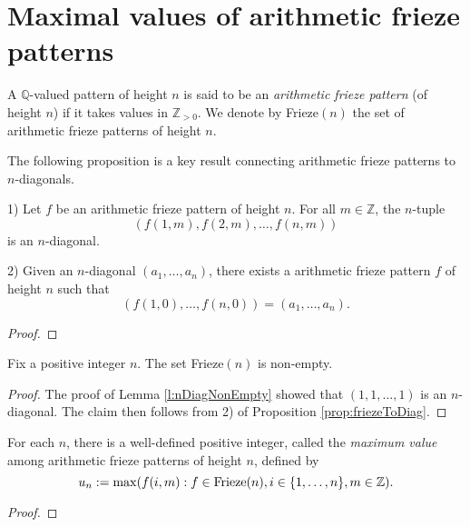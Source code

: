 \chapter{Maximal values of arithmetic frieze patterns}\label{s:arith_fp}
\begin{definition}
    \label{def:arith_fp}
        A $\mathbb{Q}$-valued pattern of height $n$ is said to be an \textit{arithmetic frieze pattern} (of height $n$) if it takes values in $\mathbb{Z}_{>0}$. 
        We denote by Frieze$(n)$ the set of arithmetic frieze patterns of height $n$. 
\end{definition}

The following proposition is a key result connecting arithmetic frieze patterns to $n$-diagonals.
\begin{proposition}
    \label{prop:friezeToDiag}
1) Let $f$ be an arithmetic frieze pattern of height $n$. For all $m \in \mathbb{Z}$, the $n$-tuple
\[
    (f (1,m), f (2,m), \ldots, f (n,m))
\]
is an $n$-diagonal.

2) Given an $n$-diagonal $(a_1, \ldots, a_n)$, there exists a arithmetic frieze pattern $f$ of height $n$ such that
\[
    (f (1,0), \ldots, f (n,0)) = (a_1, \ldots, a_n).
\]
\end{proposition}
\begin{proof}

\end{proof}

\begin{corollary}
    \label{c:friezeNonEmpty}
    Fix a positive integer $n$. The set Frieze$(n)$ is non-empty.
\end{corollary}
\begin{proof}
    The proof of Lemma \ref{l:nDiagNonEmpty} showed that $(1,1,\ldots, 1)$ is an $n$-diagonal. 
    The claim then follows from 2) of Proposition \ref{prop:friezeToDiag}.
\end{proof}

\begin{corollary}
    \label{l:maxDefined}
    For each $n$, there is a well-defined
    positive integer, called the {\it maximum value} among arithmetic frieze patterns of height $n$, defined by
    \[
        u_n := \max ( f (i,m) : f \in  {\rm Frieze}(n), i \in \{1,\ldots, n\}, m \in \mathbb{Z}).
    \]
\end{corollary}
\begin{proof}

\end{proof}


